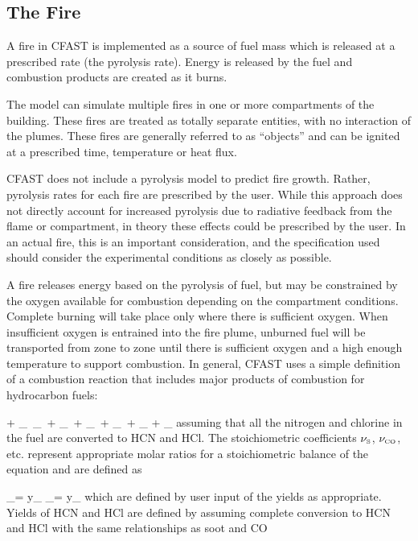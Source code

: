 \subsection{The Fire}\label{sec:TheFire}

A fire in CFAST is implemented as a source of fuel mass which is released at a prescribed rate
(the pyrolysis rate). Energy is released by the fuel and combustion products are created as it
burns.

The model can simulate multiple fires in one or more compartments of the building. These fires
are treated as totally separate entities, with no interaction of the plumes. These fires are generally
referred to as ``objects'' and can be ignited at a prescribed time, temperature or heat flux.

CFAST does not include a pyrolysis model to predict fire growth. Rather, pyrolysis rates for
each fire are prescribed by the user. While this approach does not directly account for increased
pyrolysis due to radiative feedback from the flame or compartment, in theory these effects could
be prescribed by the user. In an actual fire, this is an important consideration, and the
specification used should consider the experimental conditions as closely as possible.

A fire releases energy based on the pyrolysis of fuel, but may be constrained by the oxygen
available for combustion depending on the compartment conditions. Complete burning will take
place only where there is sufficient oxygen. When insufficient oxygen is entrained into the fire
plume, unburned fuel will be transported from zone to zone until there is sufficient oxygen and a
high enough temperature to support combustion. In general, CFAST uses a simple definition of
a combustion reaction that includes major products of combustion for hydrocarbon fuels:

\be  {} +  \nu_\OTWO \,   \rightarrow  \nu_\COTWO \,  + \nu_\HTWOO \,  + \nu_\CO \,  +
     \nu_\So \,   + \nu_\HCl {} + \nu_\HCN {} \label{stoich} \ee
assuming that all the nitrogen and chlorine in the fuel are converted to HCN and HCl. The stoichiometric coefficients $\nu_{\tiny \hbox{S}}$, $\nu_{\tiny \hbox{CO}}$, etc. represent appropriate molar ratios for a stoichiometric balance of the equation and are defined as

\be
   \nu_\So =  \; y_\So \label{soot_yield}
\ee
\be
   \nu_\CO =  \; y_\CO \label{CO_yield}
\ee
which are defined by user input of the yields as appropriate.  Yields of HCN and HCl are defined by assuming complete conversion to HCN and HCl with the same relationships as soot and CO

